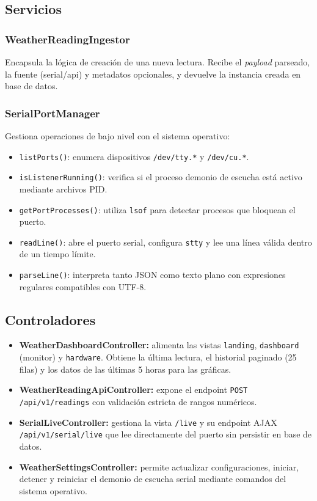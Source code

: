 \documentclass[12pt,a4paper]{report}
\begin{document}
\subsection{Servicios}
\label{subsec:servicios}

\subsubsection{WeatherReadingIngestor}
Encapsula la lógica de creación de una nueva lectura. Recibe el \textit{payload} parseado, la fuente (serial/api) y metadatos opcionales, y devuelve la instancia creada en base de datos.

\subsubsection{SerialPortManager}
Gestiona operaciones de bajo nivel con el sistema operativo:
\begin{itemize}[leftmargin=*]
    \item \texttt{listPorts()}: enumera dispositivos \texttt{/dev/tty.*} y \texttt{/dev/cu.*}.
    \item \texttt{isListenerRunning()}: verifica si el proceso demonio de escucha está activo mediante archivos PID.
    \item \texttt{getPortProcesses()}: utiliza \texttt{lsof} para detectar procesos que bloquean el puerto.
    \item \texttt{readLine()}: abre el puerto serial, configura \texttt{stty} y lee una línea válida dentro de un tiempo límite.
    \item \texttt{parseLine()}: interpreta tanto JSON como texto plano con expresiones regulares compatibles con UTF-8.
\end{itemize}

\subsection{Controladores}
\label{subsec:controladores}

\begin{itemize}[leftmargin=*]
    \item \textbf{WeatherDashboardController:} alimenta las vistas \texttt{landing}, \texttt{dashboard} (monitor) y \texttt{hardware}. Obtiene la última lectura, el historial paginado (25 filas) y los datos de las últimas 5 horas para las gráficas.
    \item \textbf{WeatherReadingApiController:} expone el endpoint \texttt{POST /api/v1/readings} con validación estricta de rangos numéricos.
    \item \textbf{SerialLiveController:} gestiona la vista \texttt{/live} y su endpoint AJAX \texttt{/api/v1/serial/live} que lee directamente del puerto sin persistir en base de datos.
    \item \textbf{WeatherSettingsController:} permite actualizar configuraciones, iniciar, detener y reiniciar el demonio de escucha serial mediante comandos del sistema operativo.
\end{itemize}
\end{document}
